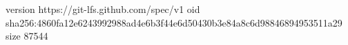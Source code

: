 version https://git-lfs.github.com/spec/v1
oid sha256:4860fa12e6243992988ad4e6b3f44e6d50430b3e84a8c6d98846894953511a29
size 87544
